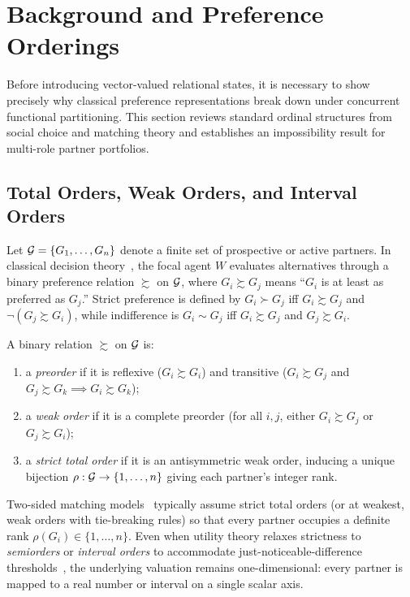 \section{Background and Preference Orderings}
\label{sec:background}

Before introducing vector-valued relational states, it is necessary to show
precisely why classical preference representations break down under concurrent
functional partitioning. This section reviews standard ordinal structures from
social choice and matching theory and establishes an impossibility result for
multi-role partner portfolios.

\subsection{Total Orders, Weak Orders, and Interval Orders}
\label{subsec:bg-orders}

Let $\mathcal{G} = \{G_1, \dots, G_n\}$ denote a finite set of prospective or
active partners. In classical decision theory~\citep{arrow1963social,fishburn1970utility,sen2017collective},
the focal agent $W$ evaluates alternatives through a binary preference relation
$\succsim$ on $\mathcal{G}$, where $G_i \succsim G_j$ means ``$G_i$ is at least
as preferred as $G_j$.'' Strict preference is defined by $G_i \succ G_j$ iff
$G_i \succsim G_j$ and $\neg(G_j \succsim G_i)$, while indifference is
$G_i \sim G_j$ iff $G_i \succsim G_j$ and $G_j \succsim G_i$.

\begin{definition}
\label{def:order-hierarchy}
A binary relation $\succsim$ on $\mathcal{G}$ is:
\begin{enumerate}[nosep]
  \item a \emph{preorder} if it is reflexive ($G_i \succsim G_i$) and transitive
        ($G_i \succsim G_j$ and $G_j \succsim G_k \implies G_i \succsim G_k$);
  \item a \emph{weak order} if it is a complete preorder (for all $i, j$, either
        $G_i \succsim G_j$ or $G_j \succsim G_i$);
  \item a \emph{strict total order} if it is an antisymmetric weak order,
        inducing a unique bijection $\rho : \mathcal{G} \to \{1, \dots, n\}$
        giving each partner's integer rank.
\end{enumerate}
\end{definition}

Two-sided matching models~\citep{gale1962college,roth1990two} typically assume
strict total orders (or at weakest, weak orders with tie-breaking rules) so that
every partner occupies a definite rank $\rho(G_i) \in \{1, \dots, n\}$. Even when
utility theory relaxes strictness to \emph{semiorders} or \emph{interval orders}
to accommodate just-noticeable-difference thresholds~\citep{fishburn1970utility},
the underlying valuation remains one-dimensional: every partner is mapped to a
real number or interval on a single scalar axis.

